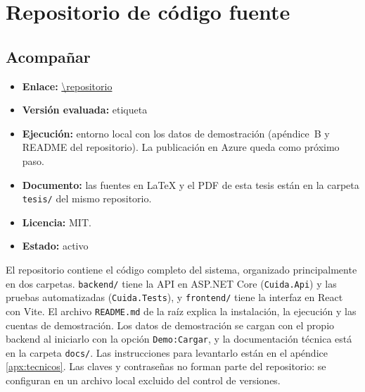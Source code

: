 
\chapter{Repositorio de código fuente}\label{anx:repositorios}

\section{Acompañar}

\begin{itemize}
    \item \textbf{Enlace:} \url{\repositorio}
    \item \textbf{Versión evaluada:} etiqueta \texttt{\versionEntregada}
    \item \textbf{Ejecución:} entorno local con los datos de demostración (apéndice~B y README del repositorio). La publicación en Azure queda como próximo paso.
    \item \textbf{Documento:} las fuentes en \LaTeX{} y el PDF de esta tesis están en la carpeta \texttt{tesis/} del mismo repositorio.
    \item \textbf{Licencia:} MIT.
    \item \textbf{Estado:} activo
\end{itemize}

El repositorio contiene el código completo del sistema, organizado principalmente en dos
carpetas. \texttt{backend/} tiene la API en ASP.NET Core
(\texttt{Cuida.Api}) y las pruebas automatizadas (\texttt{Cuida.Tests}), y
\texttt{frontend/} tiene la interfaz en React con Vite. El archivo
\texttt{README.md} de la raíz explica la instalación, la ejecución y las
cuentas de demostración. Los datos de
demostración se cargan con el propio backend al iniciarlo con la opción
\texttt{Demo:Cargar}, y la documentación técnica está en la carpeta
\texttt{docs/}. Las instrucciones para levantarlo están en el apéndice
\ref{apx:tecnicos}. Las claves y contraseñas no forman parte del
repositorio: se configuran en un archivo local excluido del control de
versiones.
